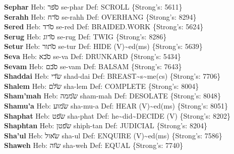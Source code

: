 {\textbf{Sephar} Heb: {\large\H ספר} se-phar Def: SCROLL \{Strong's: 5611\}\hfill{}\\

\textbf{Serahh} Heb: {\large\H סרח} se-rahh Def: OVERHANG \{Strong's: 8294\}\hfill{}\\

\textbf{Sered} Heb: {\large\H סרד} se-red Def: BRAIDED.WORK \{Strong's: 5624\}\hfill{}\\

\textbf{Serug} Heb: {\large\H סרוג} se-rug Def: TWIG \{Strong's: 8286\}\hfill{}\\

\textbf{Setur} Heb: {\large\H סתור} se-tur Def: HIDE (V)\textasciitilde{}ed(ms) \{Strong's: 5639\}\hfill{}\\

\textbf{Seva} Heb: {\large\H סבא} se-va Def: DRUNKARD \{Strong's: 5434\}\hfill{}\\

\textbf{Sevam} Heb: {\large\H סבם} se-vam Def: BALSAM \{Strong's: 7643\}\hfill{}\\

\textbf{Shaddai} Heb: {\large\H שדי} shad-dai Def: BREAST\textasciitilde{}s\textasciitilde{}me(cs) \{Strong's: 7706\}\hfill{}\\

\textbf{Shalem} Heb: {\large\H שלם} sha-lem Def: COMPLETE \{Strong's: 8004\}\hfill{}\\

\textbf{Sham'mah} Heb: {\large\H שממה} sham-mah Def: DESOLATE \{Strong's: 8048\}\hfill{}\\

\textbf{Shamu'a} Heb: {\large\H שמוע} sha-mu-a Def: HEAR (V)\textasciitilde{}ed(ms) \{Strong's: 8051\}\hfill{}\\

\textbf{Shaphat} Heb: {\large\H שפט} sha-phat Def: he\textasciitilde{}did\textasciitilde{}DECIDE (V) \{Strong's: 8202\}\hfill{}\\

\textbf{Shaphtan} Heb: {\large\H שפטן} shiph-tan Def: JUDICIAL \{Strong's: 8204\}\hfill{}\\

\textbf{Sha'ul} Heb: {\large\H שאול} sha-ul Def: ENQUIRE (V)\textasciitilde{}ed(ms) \{Strong's: 7586\}\hfill{}\\

\textbf{Shaweh} Heb: {\large\H שוה} sha-weh Def: EQUAL \{Strong's: 7740\}\hfill{}\\

}
